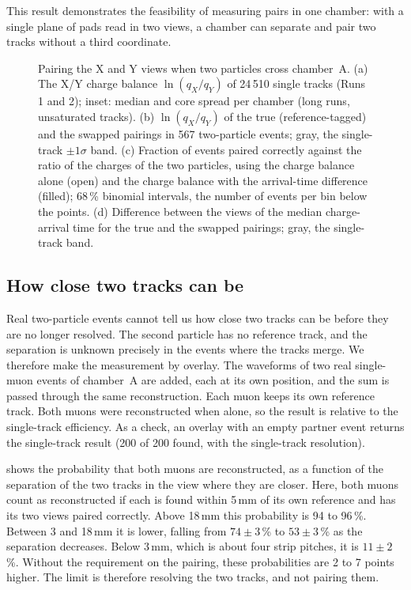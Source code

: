 This result demonstrates the feasibility of measuring pairs in one chamber: with a single plane of pads read in two
views, a chamber can separate and pair two tracks without a third coordinate.

\begin{figure}[tbp]
  \centering
  \caption{Pairing the X and Y views when two particles cross chamber~A. (a) The X/Y charge balance $\ln(q_X/q_Y)$
  of 24\,510 single tracks (Runs 1 and 2); inset: median and core spread per chamber (long runs, unsaturated tracks).
  (b) $\ln(q_X/q_Y)$ of the true (reference-tagged) and the swapped pairings in 567 two-particle events; gray, the
  single-track $\pm1\sigma$ band. (c) Fraction of events paired correctly against the ratio of the charges of the two
  particles, using the charge balance alone (open) and the charge balance with the arrival-time difference (filled);
  68\,\% binomial intervals, the number of events per bin below the points. (d) Difference between the views of the
  median charge-arrival time for the true and the swapped pairings; gray, the single-track band.}
  \label{fig:pairing}
\end{figure}

\subsection{How close two tracks can be}\label{sec:separation}
Real two-particle events cannot tell us how close two tracks can be before they are no longer resolved. The second
particle has no reference track, and the separation is unknown precisely in the events where the tracks merge. We
therefore make the measurement by overlay. The waveforms of two real single-muon events of chamber~A are added, each
at its own position, and the sum is passed through the same reconstruction. Each muon keeps its own reference track.
Both muons were reconstructed when alone, so the result is relative to the single-track efficiency. As a check, an
overlay with an empty partner event returns the single-track result (200 of 200 found, with the single-track
resolution).

 shows the probability that both muons are reconstructed, as a function of the separation of
the two tracks in the view where they are closer. Here, both muons count as reconstructed if each is found within
5\,mm of its own reference and has its two views paired correctly. Above 18\,mm this probability is 94 to 96\,\%.
Between 3 and 18\,mm it is lower, falling from $74\pm3$\,\% to $53\pm3$\,\% as the separation decreases. Below 3\,mm,
which is about four strip pitches, it is $11\pm2$\,\%. Without the requirement on the pairing, these probabilities are
2 to 7 points higher. The limit is therefore resolving the two tracks, and not pairing them.


